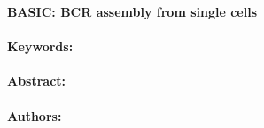 \noindent
\large {\bf BASIC: BCR assembly from single cells} 


\normalsize 


\noindent \paragraph{Keywords:} 

\noindent \paragraph{Abstract:} 



\noindent \paragraph{Authors:} 

